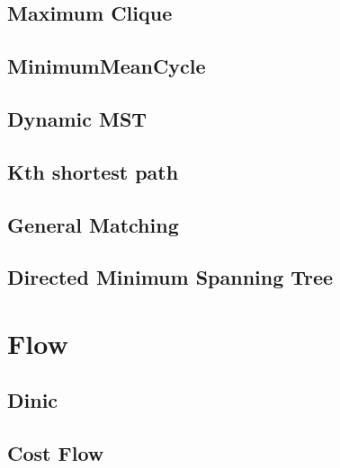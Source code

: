 \documentclass[a4paper,10pt,twocolumn,oneside]{article}
\begin{document}
\subsection{Maximum Clique}


\subsection{MinimumMeanCycle}


\subsection{Dynamic MST}


\subsection{Kth shortest path}


\subsection{General Matching}


\subsection{Directed Minimum Spanning Tree}



\section{Flow}
%

\subsection{Dinic} %


\subsection{Cost Flow} %

\end{document}
